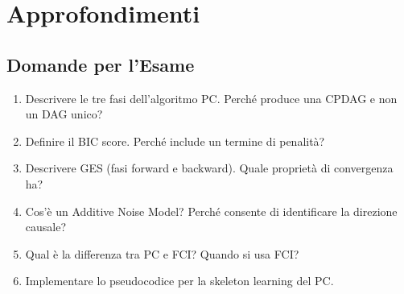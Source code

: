 \section{Approfondimenti}
\subsection{Domande per l'Esame}
\begin{enumerate}
    \item Descrivere le tre fasi dell'algoritmo PC. Perché produce una CPDAG e non un DAG unico?
    \item Definire il BIC score. Perché include un termine di penalità?
    \item Descrivere GES (fasi forward e backward). Quale proprietà di convergenza ha?
    \item Cos'è un Additive Noise Model? Perché consente di identificare la direzione causale?
    \item Qual è la differenza tra PC e FCI? Quando si usa FCI?
    \item Implementare lo pseudocodice per la skeleton learning del PC.
\end{enumerate}
